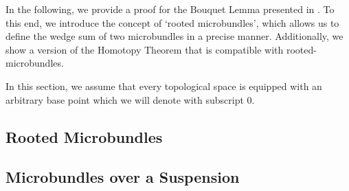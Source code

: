 \begin{myparagraph}
    In the following,
    we provide a proof for the Bouquet Lemma presented in .
    To this end, we introduce the concept of `rooted microbundles',
    which allows us to define the wedge sum of two microbundles in a precise manner.
    Additionally, we show a version of the Homotopy Theorem
    that is compatible with rooted-microbundles.

    In this section,
    we assume that every topological space is equipped with an arbitrary base point
    which we will denote with subscript $0$.
\end{myparagraph}
\subsection{Rooted Microbundles}\label{section::rooted}




\subsection{Microbundles over a Suspension}\label{section::suspension}




